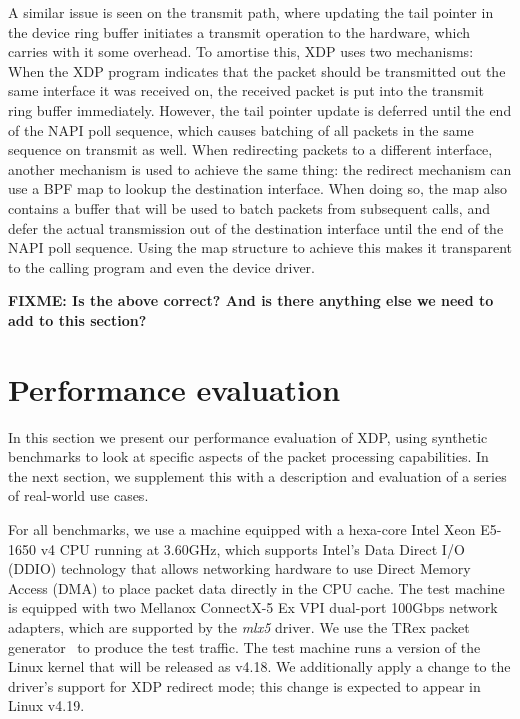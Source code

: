 \documentclass[10pt,sigconf]{acmart}
\begin{document}
A similar issue is seen on the transmit path, where updating the tail pointer in
the device ring buffer initiates a transmit operation to the hardware, which
carries with it some overhead. To amortise this, XDP uses two mechanisms: When
the XDP program indicates that the packet should be transmitted out the same
interface it was received on, the received packet is put into the transmit ring
buffer immediately. However, the tail pointer update is deferred until the end
of the NAPI poll sequence, which causes batching of all packets in the same
sequence on transmit as well. When redirecting packets to a different interface,
another mechanism is used to achieve the same thing: the redirect mechanism can
use a BPF map to lookup the destination interface. When doing so, the map also
contains a buffer that will be used to batch packets from subsequent calls, and
defer the actual transmission out of the destination interface until the end of
the NAPI poll sequence. Using the map structure to achieve this makes it
transparent to the calling program and even the device driver.

\textbf{FIXME: Is the above correct? And is there anything else we need to add
  to this section?}

\section{Performance evaluation}
\label{sec:perf-eval}
In this section we present our performance evaluation of XDP, using synthetic
benchmarks to look at specific aspects of the packet processing capabilities. In
the next section, we supplement this with a description and evaluation of a
series of real-world use cases.

For all benchmarks, we use a machine equipped with a hexa-core Intel Xeon
E5-1650 v4 CPU running at 3.60GHz, which supports Intel's Data Direct I/O (DDIO)
technology that allows networking hardware to use Direct Memory Access (DMA) to
place packet data directly in the CPU cache. The test machine is equipped with
two Mellanox ConnectX-5 Ex VPI dual-port 100Gbps network adapters, which are
supported by the \emph{mlx5} driver. We use the TRex packet
generator~\cite{cisco18:_trex_traff_gener} to produce the test traffic. The test
machine runs a version of the Linux kernel that will be released as v4.18. We
additionally apply a change to the driver's support for XDP redirect mode; this
change is expected to appear in Linux v4.19.

\end{document}
